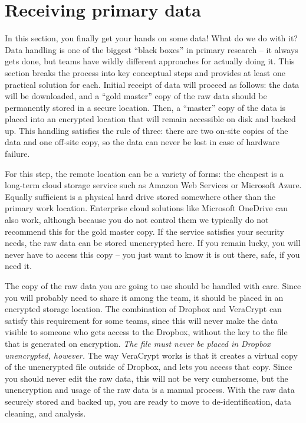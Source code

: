 
\section{Receiving primary data}

In this section, you finally get your hands on some data!
What do we do with it? Data handling is one of the biggest
``black boxes'' in primary research -- it always gets done,
but teams have wildly different approaches for actually doing it.
This section breaks the process into key conceptual steps
and provides at least one practical solution for each.
Initial receipt of data will proceed as follows:
the data will be downloaded, and a ``gold master'' copy
of the raw data should be permanently stored in a secure location.
Then, a ``master'' copy of the data is placed into an encrypted location
that will remain accessible on disk and backed up.
This handling satisfies the rule of three:
there are two on-site copies of the data and one off-site copy,
so the data can never be lost in case of hardware failure.

For this step, the remote location can be a variety of forms:
the cheapest is a long-term cloud storage service
such as Amazon Web Services or Microsoft Azure.
Equally sufficient is a physical hard drive
stored somewhere other than the primary work location.
Enterprise cloud solutions like Microsoft OneDrive
can also work, although because you do not control them
we typically do not recommend this for the gold master copy.
If the service satisfies your security needs,
the raw data can be stored unencrypted here.
If you remain lucky, you will never have to access this copy --
you just want to know it is out there, safe, if you need it.

The copy of the raw data you are going to use
should be handled with care.
Since you will probably need to share it among the team,
it should be placed in an encrypted storage location.
The combination of Dropbox and VeraCrypt
can satisfy this requirement for some teams,
since this will never make the data visible to someone
who gets access to the Dropbox,
without the key to the file that is generated on encryption.
\textit{The file must never be placed in Dropbox unencrypted, however.}
The way VeraCrypt works is that it creates a virtual copy
of the unencrypted file outside of Dropbox, and lets you access that copy.
Since you should never edit the raw data, this will not be very cumbersome,
but the unencryption and usage of the raw data is a manual process.
With the raw data securely stored and backed up,
you are ready to move to de-identification, data cleaning, and analysis.
